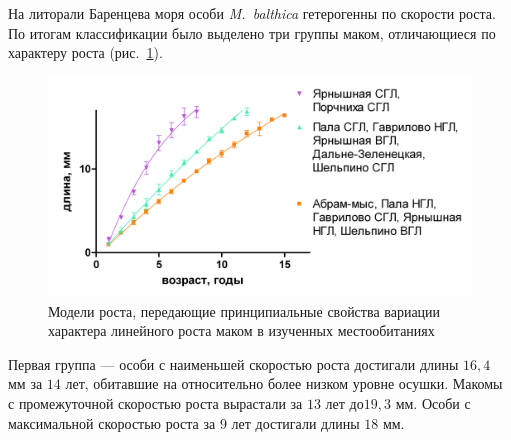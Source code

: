 {На литорали Баренцева моря особи \textit{M.~balthica} гетерогенны по скорости роста. По   итогам   классификации   было   выделено   три   группы   маком,   отличающиеся   по характеру роста (рис.~\ref{ris:Barents_clusters_gorizonts_all}).
    \begin{figure}[]
        \includegraphics[width=\textwidth]{../Barenc_Sea/growth_from_MSc/rost_clusters_all.jpg}
    \caption{Модели роста, передающие  принципиальные свойства вариации характера линейного роста маком в изученных местообитаниях}
    \label{ris:Barents_clusters_gorizonts_all}
    \end{figure}
Первая группа — особи с наименьшей скоростью роста достигали длины $16,4$ мм за $14$ лет, обитавшие на относительно более низком уровне осушки. 
Макомы с промежуточной   скоростью   роста   вырастали   за   $13$   лет   $до   19,3$   мм.   
Особи   с   максимальной скоростью роста за $9$ лет достигали длины $18$ мм.

}
